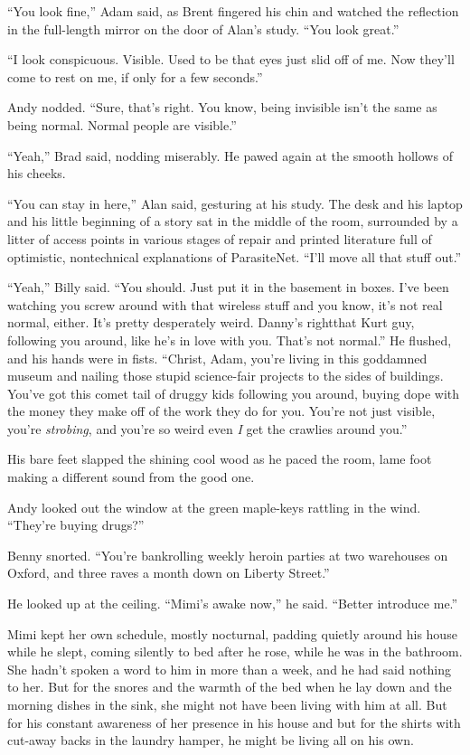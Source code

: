 ``You look fine,'' Adam said, as Brent fingered his chin and watched
the reflection in the full-length mirror on the door of Alan's study. 
``You look great.''

``I look conspicuous.  Visible.  Used to be that eyes just slid off of
me.  Now they'll come to rest on me, if only for a few seconds.''

Andy nodded.  ``Sure, that's right.  You know, being invisible isn't
the same as being normal.  Normal people are visible.''

``Yeah,'' Brad said, nodding miserably.  He pawed again at the smooth
hollows of his cheeks.

``You can stay in here,'' Alan said, gesturing at his study.  The desk
and his laptop and his little beginning of a story sat in the middle
of the room, surrounded by a litter of access points in various stages
of repair and printed literature full of optimistic, nontechnical
explanations of ParasiteNet.  ``I'll move all that stuff out.''

``Yeah,'' Billy said.  ``You should.  Just put it in the basement in
boxes.  I've been watching you screw around with that wireless stuff
and you know, it's not real normal, either.  It's pretty desperately
weird.  Danny's right\dash{}that Kurt guy, following you around, like he's
in love with you.  That's not normal.'' He flushed, and his hands were
in fists.  ``Christ, Adam, you're living in this goddamned museum and
nailing those stupid science-fair projects to the sides of buildings. 
You've got this comet tail of druggy kids following you around, buying
dope with the money they make off of the work they do for you.  You're
not just visible, you're \textit{strobing}, and you're so weird even
\textit{I} get the crawlies around you.''

His bare feet slapped the shining cool wood as he paced the room, lame
foot making a different sound from the good one.

Andy looked out the window at the green maple-keys rattling in the
wind.  ``They're buying drugs?''

Benny snorted.  ``You're bankrolling weekly heroin parties at two
warehouses on Oxford, and three raves a month down on Liberty
Street.''

He looked up at the ceiling.  ``Mimi's awake now,'' he said.  ``Better
introduce me.''

Mimi kept her own schedule, mostly nocturnal, padding quietly around
his house while he slept, coming silently to bed after he rose, while
he was in the bathroom.  She hadn't spoken a word to him in more than
a week, and he had said nothing to her.  But for the snores and the
warmth of the bed when he lay down and the morning dishes in the sink,
she might not have been living with him at all.  But for his constant
awareness of her presence in his house and but for the shirts with
cut-away backs in the laundry hamper, he might be living all on his
own.

